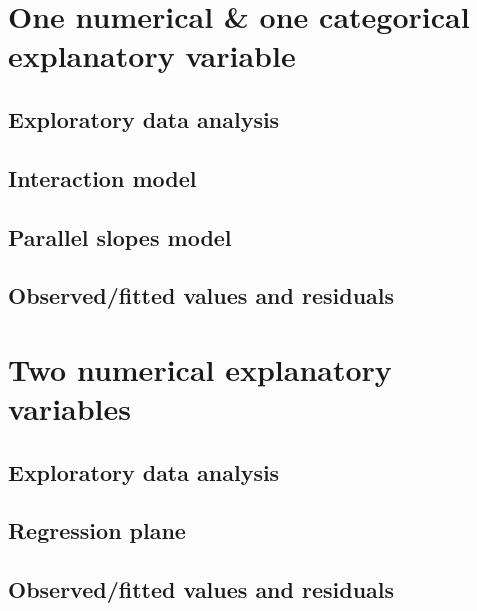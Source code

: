\documentclass[12pt, krantz2,]{krantz}
\begin{document}
\hypertarget{model4}{%
\section{One numerical \& one categorical explanatory variable}\label{model4}}

\hypertarget{model4EDA}{%
\subsection{Exploratory data analysis}\label{model4EDA}}

\hypertarget{model4interactiontable}{%
\subsection{Interaction model}\label{model4interactiontable}}

\hypertarget{model4table}{%
\subsection{Parallel slopes model}\label{model4table}}

\hypertarget{model4points}{%
\subsection{Observed/fitted values and residuals}\label{model4points}}

\hypertarget{model3}{%
\section{Two numerical explanatory variables}\label{model3}}

\hypertarget{model3EDA}{%
\subsection{Exploratory data analysis}\label{model3EDA}}

\hypertarget{model3table}{%
\subsection{Regression plane}\label{model3table}}

\hypertarget{model3points}{%
\subsection{Observed/fitted values and residuals}\label{model3points}}
\end{document}
